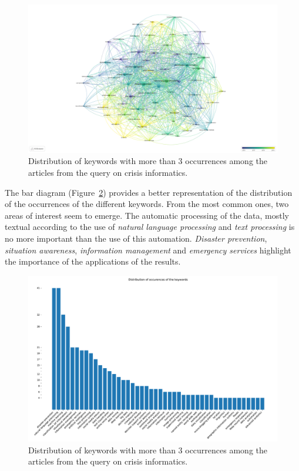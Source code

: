 \begin{landscape}
    \begin{figure}[htb]
        \includegraphics[width=\paperwidth,height=\paperheight,keepaspectratio]{figures/chap-2/crisis-informatic-overlay.pdf}
        \caption{Distribution of keywords with more than 3 occurrences among the articles from the query on crisis informatics. }
        \label{literature:crisis-informatic-overlay}
    \end{figure}
\end{landscape}

The bar diagram (Figure~\ref{literature:crisis-informatic-bar}) provides a better representation of the distribution of the occurrences of the different keywords.
From the most common ones, two areas of interest seem to emerge.
The automatic processing of the data, mostly textual according to the use of \emph{natural language processing} and \emph{text processing} is no more important than the use of this automation.
\emph{Disaster prevention}, \emph{situation awareness}, \emph{information management} and \emph{emergency services} highlight the importance of the applications of the results.

\begin{figure}[htb]
    \includegraphics[width=\textwidth]{figures/chap-2/crisis-informatic-bar.pdf}
    \caption{Distribution of keywords with more than 3 occurrences among the articles from the query on crisis informatics. }
    \label{literature:crisis-informatic-bar}
\end{figure}

